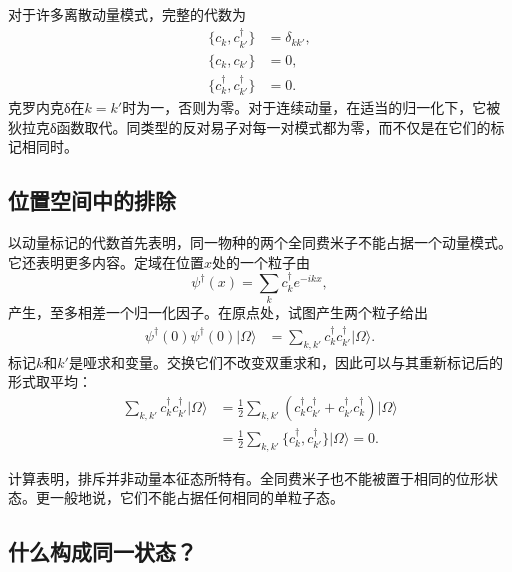 对于许多离散动量模式，完整的代数为
\begin{align}
\{c_k,c_{k'}^\dagger\}&=\delta_{kk'},
\\
\{c_k,c_{k'}\}&=0,
\\
\{c_k^\dagger,c_{k'}^\dagger\}&=0.
\end{align}
克罗内克{\proseunicodefont δ}在\(k=k'\)时为一，否则为零。对于连续动量，在适当的归一化下，它被狄拉克{\proseunicodefont δ}函数取代。同类型的反对易子对每一对模式都为零，而不仅是在它们的标记相同时。

\subsection{位置空间中的排除}

以动量标记的代数首先表明，同一物种的两个全同费米子不能占据一个动量模式。它还表明更多内容。定域在位置\(x\)处的一个粒子由
\begin{equation}
\psi^\dagger(x)=\sum_k c_k^\dagger e^{-ikx},
\end{equation}
产生，至多相差一个归一化因子。在原点处，试图产生两个粒子给出
\begin{align}
\psi^\dagger(0)\psi^\dagger(0)|\Omega\rangle
&=\sum_{k,k'}c_k^\dagger c_{k'}^\dagger|\Omega\rangle.
\end{align}
标记\(k\)和\(k'\)是哑求和变量。交换它们不改变双重求和，因此可以与其重新标记后的形式取平均：
\begin{align}
\sum_{k,k'}c_k^\dagger c_{k'}^\dagger|\Omega\rangle
&=\frac12\sum_{k,k'}
\left(c_k^\dagger c_{k'}^\dagger
+c_{k'}^\dagger c_k^\dagger\right)|\Omega\rangle
\\
&=\frac12\sum_{k,k'}
\{c_k^\dagger,c_{k'}^\dagger\}|\Omega\rangle
=0.
\end{align}

\begin{classroomqa}
\end{classroomqa}

计算表明，排斥并非动量本征态所特有。全同费米子也不能被置于相同的位形状态。更一般地说，它们不能占据任何相同的单粒子态。

\subsection{什么构成同一状态？}

